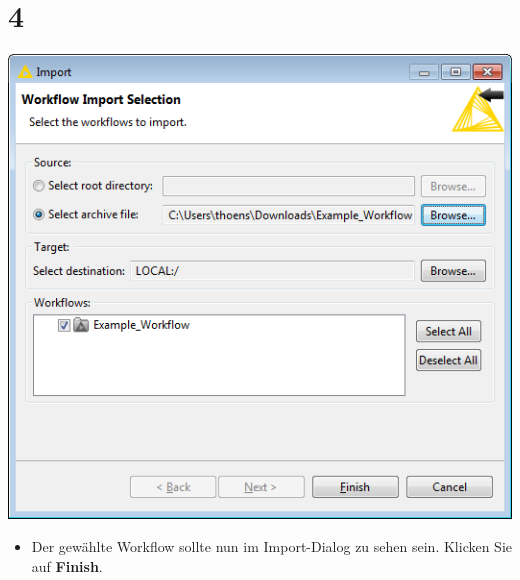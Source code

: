 \documentclass{beamer}
\begin{document}
\section{4}
\begin{frame}
	\begin{center}
  		\includegraphics[height=0.6\textheight]{4.png}
	\end{center}
	\begin{itemize}
		\item Der gewählte Workflow sollte nun im Import-Dialog zu sehen sein. Klicken Sie auf \textbf{Finish}.
	\end{itemize}
\end{frame}
\end{document}
